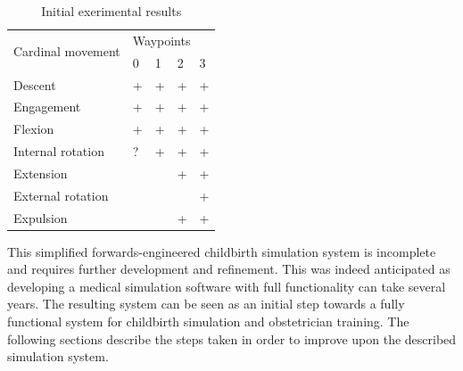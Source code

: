 \begin{table}[h]
\begin{tabular}{|l|l|l|l|l|}
\hline
\multirow{2}{*}{Cardinal movement} & \multicolumn{4}{l|}{Waypoints} \\ \cline{2-5}
                                   & 0      & 1     & 2     & 3     \\ \hline
Descent                            & +      & +     & +     & +     \\ \hline
Engagement                         & +      & +     & +     & +     \\ \hline
Flexion                            & +      & +     & +     & +     \\ \hline
Internal rotation                  & ?      & +     & +     & +     \\ \hline
Extension                          &        &       & +     & +     \\ \hline
External rotation                  &        &       &       & +     \\ \hline
Expulsion                          &        &       & +     & +     \\ \hline
\end{tabular}
\caption{Initial exerimental results} \label{hybrid-table}
\end{table}

This simplified forwards-engineered childbirth simulation system is incomplete and requires further development and refinement. This was indeed anticipated as  developing a medical simulation software with full functionality can take several years. The resulting system can be seen as an initial step towards a fully functional system for childbirth simulation and obstetrician training. The following sections describe the steps taken in order to improve upon the described simulation system.
